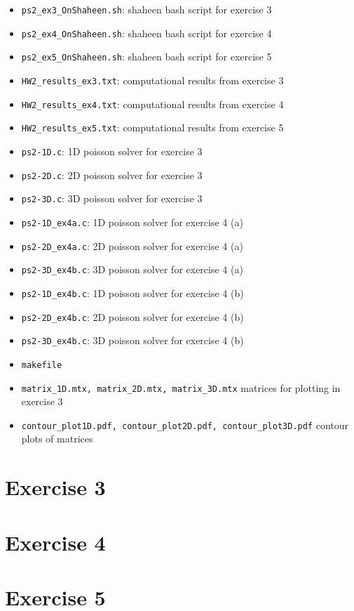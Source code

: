 \documentclass[
a4paper,
]{article}
\newcommand{\1}{\mathds{1}}
\begin{document}
\begin{itemize}
\item \texttt{ps2\_ex3\_OnShaheen.sh}: shaheen bash script for exercise 3
\item \texttt{ps2\_ex4\_OnShaheen.sh}: shaheen bash script for exercise 4
\item \texttt{ps2\_ex5\_OnShaheen.sh}: shaheen bash script for exercise 5
\item \texttt{HW2\_results\_ex3.txt}: computational results from exercise 3
\item \texttt{HW2\_results\_ex4.txt}: computational results from exercise 4
\item \texttt{HW2\_results\_ex5.txt}: computational results from exercise 5
\item \texttt{ps2-1D.c}: 1D poisson solver for exercise 3
\item \texttt{ps2-2D.c}: 2D poisson solver for exercise 3
\item \texttt{ps2-3D.c}: 3D poisson solver for exercise 3
\item \texttt{ps2-1D\_ex4a.c}: 1D poisson solver for exercise 4 (a)
\item \texttt{ps2-2D\_ex4a.c}: 2D poisson solver for exercise 4 (a)
\item \texttt{ps2-3D\_ex4b.c}: 3D poisson solver for exercise 4 (a)
\item \texttt{ps2-1D\_ex4b.c}: 1D poisson solver for exercise 4 (b)
\item \texttt{ps2-2D\_ex4b.c}: 2D poisson solver for exercise 4 (b)
\item \texttt{ps2-3D\_ex4b.c}: 3D poisson solver for exercise 4 (b)
\item \texttt{makefile}
\item \texttt{matrix\_1D.mtx, matrix\_2D.mtx, matrix\_3D.mtx} matrices for plotting in exercise 3
\item \texttt{contour\_plot1D.pdf, contour\_plot2D.pdf, contour\_plot3D.pdf} contour plots of matrices
\end{itemize}
		
        \section*{Exercise 3}
		
		\null\newpage
		
        \section*{Exercise 4}
        
        \null\newpage
        
	    \section*{Exercise 5}
        
        \null\newpage
        
        
\end{document}
